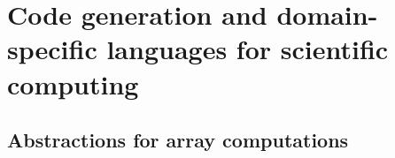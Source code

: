 \documentclass[thesis]{subfiles}
\begin{document}
\section{Code generation and domain-specific languages for scientific computing}



\cite{stroutSparsePolyhedralFramework2018} %
\cite{mirchandaneyPrinciplesRuntimeSupport1988} %
\cite{arenazInspectorExecutorAlgorithmIrregular2004} %


\subsection{Abstractions for array computations}

\end{document}
